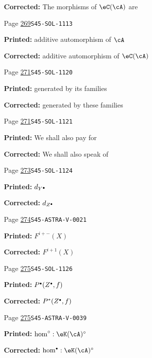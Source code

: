 \documentclass[oneside]{book}
\theoremstyle{sga-source}
\theoremstyle{sga-source-dash}
\theoremstyle{sga-source-dotdash}
\theoremstyle{sga-source-number-note-dash}
\theoremstyle{sga-source-note-number-dotdash}
\theoremstyle{sga-source-example-dotdash}
\theoremstyle{sga-source-inline-number}
\theoremstyle{sga-source-bare-number}
\theoremstyle{sga-source}
\let\oldbullet\bullet
\renewcommand{\bullet}{\textnormal{\tiny$\oldbullet$}}
\begin{document}
\begin{description}
\par\noindent\textbf{Corrected:} The morphisms of $\eC(\cA)$ are
\smallskip
\item[\hypertarget{apparatus:EN-0194}{194}] Page \hyperlink{printpage:en:269}{269}\quad\texttt{S45-SOL-1113}
\par\noindent\textbf{Printed:} additive automorphism of $\cA$
\par\noindent\textbf{Corrected:} additive automorphism of $\eC(\cA)$
\smallskip
\item[\hypertarget{apparatus:EN-0195}{195}] Page \hyperlink{printpage:en:271}{271}\quad\texttt{S45-SOL-1120}
\par\noindent\textbf{Printed:} generated
    by its families
\par\noindent\textbf{Corrected:} generated
    by these families
\smallskip
\item[\hypertarget{apparatus:EN-0196}{196}] Page \hyperlink{printpage:en:271}{271}\quad\texttt{S45-SOL-1121}
\par\noindent\textbf{Printed:} We shall also pay for
\par\noindent\textbf{Corrected:} We shall also speak of
\smallskip
\item[\hypertarget{apparatus:EN-0197}{197}] Page \hyperlink{printpage:en:273}{273}\quad\texttt{S45-SOL-1124}
\par\noindent\textbf{Printed:} \(d_{Y^\bullet}\)
\par\noindent\textbf{Corrected:} \(d_{Z^\bullet}\)
\smallskip
\item[\hypertarget{apparatus:EN-0198}{198}] Page \hyperlink{printpage:en:274}{274}\quad\texttt{S45-ASTRA-V-0021}
\par\noindent\textbf{Printed:} \(F^{i+-}(X)\)
\par\noindent\textbf{Corrected:} \(F^{i+1}(X)\)
\smallskip
\item[\hypertarget{apparatus:EN-0199}{199}] Page \hyperlink{printpage:en:275}{275}\quad\texttt{S45-SOL-1126}
\par\noindent\textbf{Printed:} \(P^\bullet(Z^\bullet,f)\)
\par\noindent\textbf{Corrected:} \(P^\ast(Z^\bullet,f)\)
\smallskip
\item[\hypertarget{apparatus:EN-0200}{200}] Page \hyperlink{printpage:en:275}{275}\quad\texttt{S45-ASTRA-V-0039}
\par\noindent\textbf{Printed:} \(\hom^\circ:\eK(\cA)^\circ\)
\par\noindent\textbf{Corrected:} \(\hom^\bullet:\eK(\cA)^\circ\)
\smallskip

\end{description}
\end{document}
